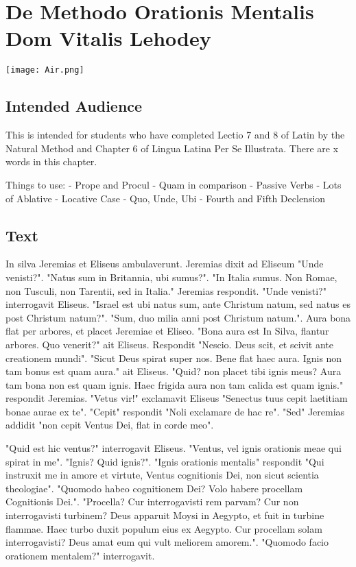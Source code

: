 \chapter{De Methodo Orationis Mentalis Dom Vitalis Lehodey}
\begin{center}
\texttt{[image: Air.png]}
\end{center}

\section{Intended Audience}
This is intended for students who have completed Lectio 7 and 8 of Latin by the Natural Method and Chapter 6 of Lingua Latina Per Se Illustrata. There are x words in this chapter.

Things to use:
	- Prope and Procul
	- Quam in comparison
	- Passive Verbs
	- Lots of Ablative
	- Locative Case 
	- Quo, Unde, Ubi
	- Fourth and Fifth Declension

\section{Text}
In silva Jeremias et Eliseus ambulaverunt. Jeremias dixit ad Eliseum "Unde venisti?". "Natus sum in Britannia, ubi sumus?". "In Italia sumus. Non Romae, non Tusculi, non Tarentii, sed in Italia." Jeremias respondit. "Unde venisti?" interrogavit Eliseus. "Israel est ubi natus sum, ante Christum natum, sed natus es post Christum natum?". "Sum, duo milia anni post Christum natum.". Aura bona flat per arbores, et placet Jeremiae et Eliseo. "Bona aura est In Silva, flantur arbores.  Quo venerit?" ait Eliseus. Respondit "Nescio. Deus scit, et scivit ante creationem mundi". "Sicut Deus spirat super nos.  Bene flat haec aura. Ignis non tam bonus est quam aura." ait Eliseus. "Quid? non placet tibi ignis meus? Aura tam bona non est quam ignis. Haec frigida aura non tam calida est quam ignis." respondit Jeremias. "Vetus vir!" exclamavit Eliseus "Senectus tuus cepit laetitiam bonae aurae ex te". "Cepit" respondit "Noli exclamare de hac re". "Sed" Jeremias addidit "non cepit Ventus Dei, flat in corde meo". 

"Quid est hic ventus?" interrogavit Eliseus. "Ventus, vel ignis orationis meae qui spirat in me". "Ignis? Quid ignis?". "Ignis orationis mentalis" respondit "Qui instruxit me in amore et virtute, Ventus cognitionis Dei, non sicut scientia theologiae". "Quomodo habeo cognitionem Dei? Volo habere procellam Cognitionis Dei.". "Procella? Cur interrogavisti rem parvam? Cur non interrogavisti turbinem? Deus apparuit Moysi in Aegypto, et fuit in turbine flammae. Haec turbo duxit populum eius ex Aegypto. Cur procellam solam interrogavisti? Deus amat eum qui vult meliorem amorem.". "Quomodo facio orationem mentalem?" interrogavit. 

